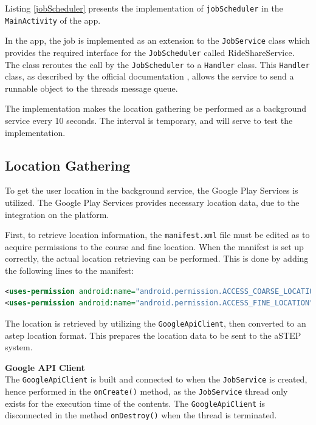 Listing \ref{jobScheduler} presents the implementation of \texttt{jobScheduler} in the \texttt{MainActivity} of the app.

In the app, the job is implemented as an extension to the \texttt{JobService} class which provides the required interface for the \texttt{JobScheduler} called RideShareService.
The class reroutes the call by the \texttt{JobScheduler} to a \texttt{Handler} class.
This \texttt{Handler} class, as described by the official documentation \cite{handler}, allows the service to send a runnable object to the threads message queue.

The implementation makes the location gathering be performed as a background service every 10 seconds.
The interval is temporary, and will serve to test the implementation.




\subsection{Location Gathering} \DIFaddbegin \label{section:locationgathering}
\DIFaddend %
To get the user location in the background service, the Google Play Services is utilized.
The Google Play Services provides necessary location data, due to the integration on the platform.

First, to retrieve location information, the \texttt{manifest.xml} file must be edited as to acquire permissions to the course and fine location.
When the manifest is set up correctly, the actual location retrieving can be performed.
This is done by adding the following lines to the manifest:
\begin{lstlisting}[language=XML]
<uses-permission android:name="android.permission.ACCESS_COARSE_LOCATION"/>
<uses-permission android:name="android.permission.ACCESS_FINE_LOCATION"/>
\end{lstlisting}

The location is retrieved by utilizing the \texttt{GoogleApiClient}, then converted to an \gls{astep} location format.
This prepares the location data to be sent to the aSTEP system.


\textbf{Google API Client}\\
The \texttt{GoogleApiClient} is built and connected to when the \texttt{JobService} is created, hence performed in the \texttt{onCreate()} method, as the \texttt{JobService} thread only exists for the execution time of the contents.
The \texttt{GoogleApiClient} is disconnected in the method \texttt{onDestroy()} when the thread is terminated.

